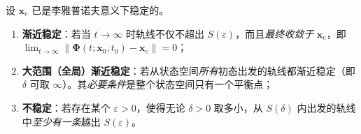 \begin{definition}\label{def:lyap-asymp}
设 $\mathbf{x}_e$ 已是李雅普诺夫意义下稳定的。
\begin{enumerate}
  \item \textbf{渐近稳定}：若当 $t\to\infty$ 时轨线不仅不超出 $S(\varepsilon)$，而且\emph{最终收敛于} $\mathbf{x}_e$，即 $\lim_{t\to\infty}\|\boldsymbol\Phi(t;\mathbf{x}_0,t_0)-\mathbf{x}_e\|=0$；
  \item \textbf{大范围（全局）渐近稳定}：若从状态空间\emph{所有}初态出发的轨线都渐近稳定（即 $\delta$ 可取 $\infty$）。其\emph{必要条件}是整个状态空间只有一个平衡点；
  \item \textbf{不稳定}：若存在某个 $\varepsilon>0$，使得无论 $\delta>0$ 取多小，从 $S(\delta)$ 内出发的轨线中\emph{至少有一条}越出 $S(\varepsilon)$。
\end{enumerate}
\end{definition}

